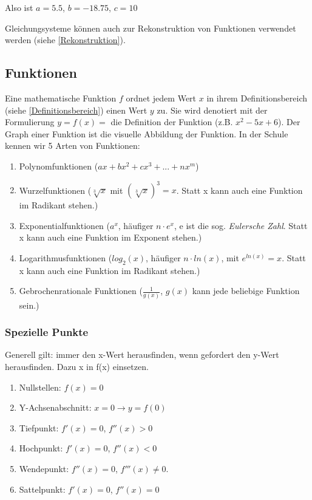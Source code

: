 \documentclass{article}
\begin{document}
Also ist $a=5.5$, $b=-18.75$, $c=10$

Gleichungsysteme können auch zur Rekonstruktion von Funktionen verwendet werden (siehe \ref{Rekonstruktion}). 

\subsection{Funktionen}
Eine mathematische Funktion $f$ ordnet jedem Wert $x$ in ihrem Definitionsbereich (siehe \ref{Definitionsbereich})
einen Wert $y$ zu. Sie wird denotiert mit der Formulierung $y=f(x)= $ die Definition der Funktion (z.B. $x^2-5x+6$).
Der Graph einer Funktion ist die visuelle Abbildung der Funktion. In der Schule kennen wir 5 Arten von Funktionen:
\begin{enumerate}
    \item Polynomfunktionen ($ax+bx^2+cx^3+...+nx^m$)
    \item Wurzelfunktionen ($ \sqrt[3]{x} $ mit $ (\sqrt[3]{x})^3=x $. Statt x kann auch eine Funktion im Radikant stehen.)
    \item Exponentialfunktionen ($a^{x}$, häufiger $n \cdot e^x$, e ist die sog. \emph{Eulersche Zahl}. Statt x kann auch eine Funktion im Exponent stehen.)
    \item Logarithmusfunktionen ($log_2(x)$, häufiger $n \cdot ln(x)$, mit $e^{ln(x)}=x$. Statt x kann auch eine Funktion im Radikant stehen.)
    \item Gebrochenrationale Funktionen ($\frac{1}{g(x)}$, $g(x)$ kann jede beliebige Funktion sein.)

\end{enumerate}

\subsubsection{Spezielle Punkte}\label{Spezielle Punkte}

Generell gilt: immer den x-Wert herausfinden, wenn gefordert den y-Wert herausfinden. Dazu x in f(x) einsetzen.

\begin{enumerate}
    \item Nullstellen: $f(x)=0$
    \item Y-Achsenabschnitt: $x=0 \rightarrow y=f(0)$
    \item Tiefpunkt: $f'(x)=0$, $f''(x)>0$
    \item Hochpunkt: $f'(x)=0$, $f''(x)<0$
    \item Wendepunkt: $f''(x)=0$, $f'''(x)\neq 0$.
    \item Sattelpunkt: $f'(x)=0$, $f''(x)=0$
\end{enumerate}
\end{document}
